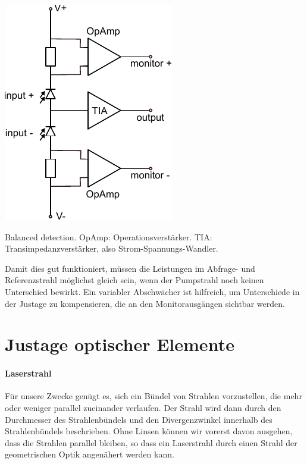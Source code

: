 \begin{marginfigure}
	\includegraphics{bilder/balanced.pdf}
	\caption{Balanced detection. OpAmp: Operationsverstärker. TIA: Transimpedanzverstärker, also Strom-Spannungs-Wandler.}
\end{marginfigure}

Damit dies gut funktioniert, müssen die Leistungen im Abfrage- und Referenzstrahl möglichst gleich sein, wenn der Pumpstrahl noch keinen Unterschied bewirkt. Ein variabler Abschwächer ist hilfreich, um Unterschiede in der Justage zu kompensieren, die an den Monitorausgängen sichtbar werden.








\section{Justage optischer Elemente}


\paragraph*{Laserstrahl} Für unsere Zwecke genügt es, sich ein Bündel von Strahlen vorzustellen, die mehr oder weniger parallel zueinander verlaufen. Der Strahl wird dann durch den Durchmesser des Strahlenbündels und den Divergenzwinkel innerhalb des Strahlenbündels beschrieben. Ohne Linsen können wir vorerst davon ausgehen, dass die Strahlen parallel bleiben, so dass ein Laserstrahl durch einen Strahl der geometrischen Optik angenähert werden kann.

